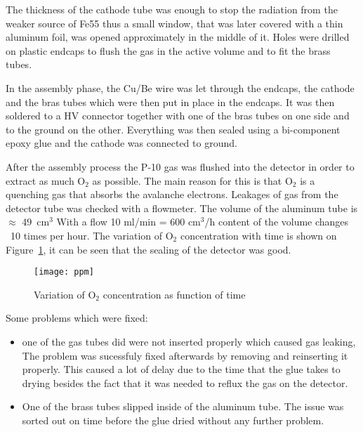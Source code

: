 The thickness of the cathode tube was enough to stop the radiation from the
weaker source of Fe55 thus a small window, that was later covered with a thin
aluminum foil, was opened approximately in the middle of it. Holes were drilled
on plastic endcaps to flush the gas in the active volume and to fit the brass
tubes.

In the assembly phase, the Cu/Be wire was let through the endcaps, the cathode
and the bras tubes which were then put in place in the endcaps. It was then
soldered to a HV connector together with one of the bras tubes on one side and
to the ground on the other. Everything was then sealed using a bi-component
epoxy glue and the cathode was connected to ground.

After the assembly process the P-10 gas was flushed into the detector in order
to extract as much O$_2$ as possible. The main reason for this is that O$_2$ is
a quenching gas that absorbs the avalanche electrons. Leakages of gas from the
detector tube was checked with a flowmeter. The volume of the aluminum tube is
$\approx$ 49~cm$^3$
With a flow 10 ml/min = 600 cm$^3$/h content of the volume changes ~10 times per
hour. The variation of O$_{2}$ concentration with time is shown on
Figure~\ref{fig:ppm}, it can be seen that the sealing of the detector was
good.
\begin{figure}[!h]
  \centering
  \texttt{[image: ppm]}
  \caption{Variation of O$_2$ concentration as function of time}
  \label{fig:ppm}
\end{figure}

Some problems which were fixed:
\begin{itemize}
\item one of the gas tubes did were not inserted properly which caused gas
  leaking, The problem was sucessfuly fixed afterwards by removing and
  reinserting it properly.  This caused a lot of delay due to the time that the
  glue takes to drying besides the fact that it was needed to reflux the gas on
  the detector.
\item One of the brass tubes slipped inside of the aluminum tube. The issue
  was sorted out on time before the glue dried without any further problem.
\end{itemize}

